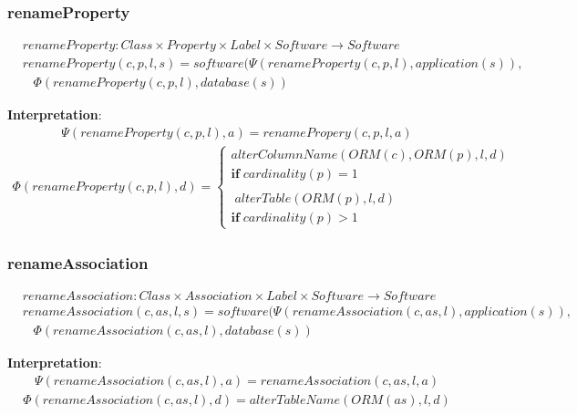\documentclass[10pt]{article}
\begin{document}
\subsubsection{renameProperty}
\begin{align}
& renameProperty: Class \times Property \times Label \times Software \rightarrow Software \nonumber \\
& renameProperty(c, p, l, s) = software(\Psi(renameProperty(c, p, l), application(s)),  \nonumber \\ 
& \;\;\; \Phi(renameProperty(c, p, l), database(s))
\end{align}

\noindent \textbf{Interpretation}:
\begin{align}
\Psi(renameProperty(c, p, l), a) = renamePropery(c, p, l, a) 
\end{align}
\begin{align}
\Phi(renameProperty(c, p, l), d) = \begin{cases}
  alterColumnName(ORM(c), ORM(p), l,  d) \\ \mathbf{if} \; cardinality(p) = 1  \\\\ 
  \; alterTable(ORM(p), l,  d) \\
  \mathbf{if} \; cardinality(p) > 1  
   \end{cases}
\end{align}

\subsubsection{renameAssociation}
\begin{align}
& renameAssociation: Class \times Association \times Label \times Software \rightarrow Software \nonumber \\
& renameAssociation(c, as, l, s) = software(\Psi(renameAssociation(c, as, l), application(s)),  \nonumber \\ 
& \;\;\;\Phi(renameAssociation(c, as, l), database(s))
\end{align}

\noindent \textbf{Interpretation}:
\begin{align}
\Psi(renameAssociation(c, as, l), a) = renameAssociation(c, as, l, a)
\end{align}
\begin{align}
\Phi(renameAssociation(c, as, l), d) = alterTableName(ORM(as), l, d)
\end{align}
\end{document}
